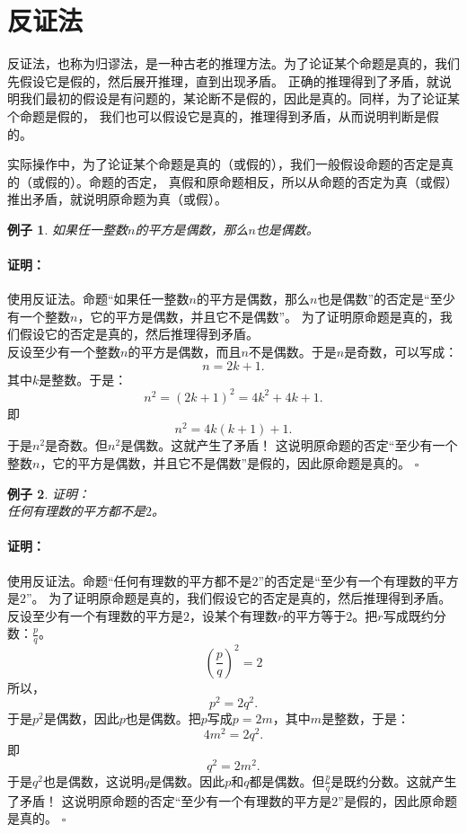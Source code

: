 \documentclass[12pt,UTF8]{ctexbook}
\newtheorem{ex}{例子}[section]
\newenvironment{proof2}{\paragraph{\textbf{证明：}}}{\hfill$\square$}
\begin{document}
\section{反证法}
反证法，也称为归谬法，是一种古老的推理方法。为了论证某个命题是真的，我们先假设它是假的，然后展开推理，直到出现矛盾。
正确的推理得到了矛盾，就说明我们最初的假设是有问题的，某论断不是假的，因此是真的。同样，为了论证某个命题是假的，
我们也可以假设它是真的，推理得到矛盾，从而说明判断是假的。

实际操作中，为了论证某个命题是真的（或假的），我们一般假设命题的否定是真的（或假的）。命题的否定，
真假和原命题相反，所以从命题的否定为真（或假）推出矛盾，就说明原命题为真（或假）。

\begin{ex}\label{ex:2-0-0}
    如果任一整数$n$的平方是偶数，那么$n$也是偶数。
\end{ex}
\begin{proof2}
    使用反证法。命题“如果任一整数$n$的平方是偶数，那么$n$也是偶数”的否定是“至少有一个整数$n$，它的平方是偶数，并且它不是偶数”。
    为了证明原命题是真的，我们假设它的否定是真的，然后推理得到矛盾。\\
    反设至少有一个整数$n$的平方是偶数，而且$n$不是偶数。于是$n$是奇数，可以写成：
    $$ n = 2k+1.$$
    其中$k$是整数。于是：
    $$ n^2 = (2k+1)^2 = 4k^2 + 4k + 1.$$
    即
    $$ n^2 = 4k(k+1)+1.$$
    于是$n^2$是奇数。但$n^2$是偶数。这就产生了矛盾！
    这说明原命题的否定“至少有一个整数$n$，它的平方是偶数，并且它不是偶数”是假的，因此原命题是真的。
\end{proof2}

\begin{ex}\label{ex:2-0-1}
    证明：\\
    任何有理数的平方都不是$2$。
\end{ex}
\begin{proof2}
    使用反证法。命题“任何有理数的平方都不是$2$”的否定是“至少有一个有理数的平方是$2$”。
    为了证明原命题是真的，我们假设它的否定是真的，然后推理得到矛盾。\\
    反设至少有一个有理数的平方是$2$，设某个有理数$r$的平方等于$2$。把$r$写成既约分数：$\frac{p}{q}$。
    $$ \left(\frac{p}{q}\right)^2 = 2$$
    所以，
    $$ p^2 = 2q^2.$$
    于是$p^2$是偶数，因此$p$也是偶数。把$p$写成$p = 2m$，其中$m$是整数，于是：
    $$ 4m^2 = 2q^2.$$
    即
    $$ q^2 = 2m^2.$$
    于是$q^2$也是偶数，这说明$q$是偶数。因此$p$和$q$都是偶数。但$\frac{p}{q}$是既约分数。这就产生了矛盾！
    这说明原命题的否定“至少有一个有理数的平方是$2$”是假的，因此原命题是真的。
\end{proof2}
\end{document}
